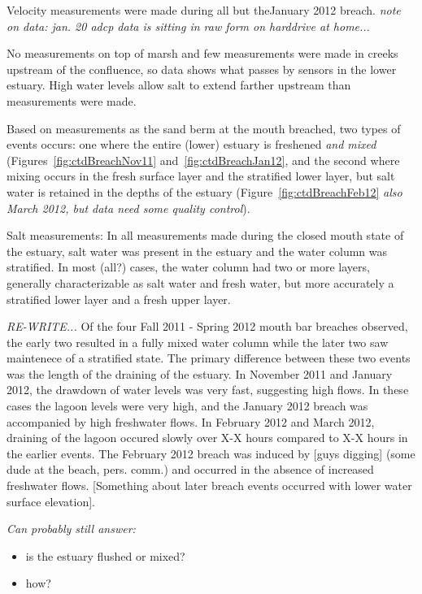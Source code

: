 {Velocity measurements were made during all but theJanuary 2012 breach. \emph{note on data: jan. 20 adcp data is sitting in raw form on harddrive at home...}

No measurements on top of marsh and few measurements were made in
creeks upstream of the confluence, so data shows what passes by sensors in the lower estuary. High water
levels allow salt to extend farther upstream than measurements were made.

Based on measurements as the sand berm at the mouth breached, two types of events occurs: one where the entire (lower) estuary is freshened \emph{and mixed} (Figures~\ref{fig:ctdBreachNov11} and~\ref{fig:ctdBreachJan12}, and the second where mixing occurs in the fresh surface layer and the stratified lower layer, but salt water is retained in the depths of the estuary (Figure~\ref{fig:ctdBreachFeb12} \emph{also March 2012, but data need some quality control}).

Salt measurements:
In all measurements made during the closed mouth state of the estuary, salt water was present in the estuary and the water column was stratified. In most (all?) cases, the water column had two or more layers, generally characterizable as salt water and fresh water, but more accurately a stratified lower layer and a fresh upper layer. 

\emph{RE-WRITE...} Of the four Fall 2011 - Spring 2012 mouth bar breaches observed, the early two resulted in a fully mixed water column while the later two saw maintenece of a stratified state. The primary difference between these two events was the length of the draining of the estuary. In November 2011 and January 2012, the drawdown of water levels was very fast, suggesting high flows. In these cases the lagoon levels were very high, and the January 2012 breach was accompanied by high freshwater flows. In February 2012 and March 2012, draining of the lagoon occured slowly over X-X hours compared to X-X hours in the earlier events. The February 2012 breach was induced by [guys digging] (some dude at the beach, pers. comm.) and occurred in the absence of increased freshwater flows. [Something about later breach events occurred with lower water surface elevation].

\emph{Can probably still answer:}
\begin{itemize} 
	\item is the estuary flushed or mixed?
	\item how?
\end{itemize}

}
